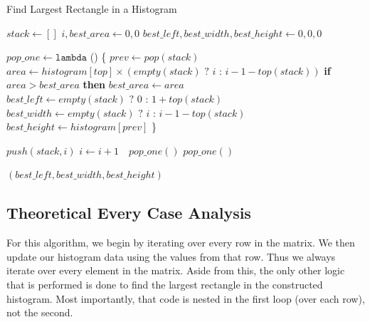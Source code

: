 \documentclass{article}
\begin{document}
\FloatBarrier
\begin{algorithm}
\caption{Find Largest Rectangle in a Histogram}
\begin{algorithmic}[1]
	\State $stack \gets []$
	\State $i, best\_area \gets 0, 0$
	\State $best\_left, best\_width, best\_height \gets 0, 0, 0$

	\State $pop\_one \gets \texttt{lambda}$ () \{
		\State \hspace{\algorithmicindent} $prev \gets pop(stack)$
		\State \hspace{\algorithmicindent} $area \gets histogram[top] \times (empty(stack) \texttt{ ? } i \texttt{ : } i - 1 - top(stack))$
		\State \hspace{\algorithmicindent} {\textbf{if} $area > best\_area$ \textbf{then}}
			\State \hspace{\algorithmicindent} \hspace{\algorithmicindent} $best\_area \gets area$
			\State \hspace{\algorithmicindent} \hspace{\algorithmicindent} $best\_left \gets empty(stack) \texttt{ ? } 0 \texttt{ : } 1 + top(stack)$
			\State \hspace{\algorithmicindent} \hspace{\algorithmicindent} $best\_width \gets empty(stack) \texttt{ ? } i \texttt{ : } i - 1 - top(stack)$
			\State \hspace{\algorithmicindent} \hspace{\algorithmicindent} $best\_height \gets histogram[prev]$
	\State \}

			\State $push(stack, i)$
			\State $i \gets i + 1$
		\Else $\texttt{ }pop\_one()$
		\EndIf
	\EndWhile
	 $pop\_one()$ \EndWhile

	\State \Return $(best\_left, best\_width, best\_height)$
\EndFunction
\end{algorithmic}
\end{algorithm}
\FloatBarrier

\subsection {Theoretical Every Case Analysis}

For this algorithm, we begin by iterating over every row in the matrix.
We then update our histogram data using the values from that row.
Thus we always iterate over every element in the matrix.
Aside from this, the only other logic that is performed is done to find the largest rectangle in the constructed histogram.
Most importantly, that code is nested in the first loop (over each row), not the second.
\end{document}
